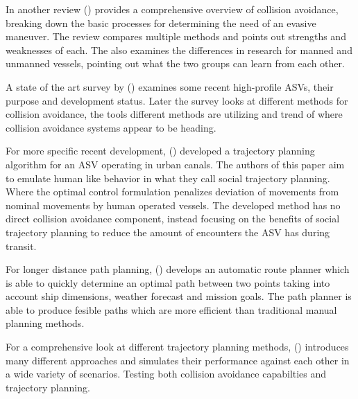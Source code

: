 In another review (\cite{huang2020ship}) provides a comprehensive overview of collision avoidance, breaking down the basic processes
for determining the need of an evasive maneuver. The review compares multiple methods and points out strengths and weaknesses of each.
The also examines the differences in research for manned and unmanned vessels, pointing out what the two groups can learn from each other.

A state of the art survey by (\cite{zhang2021collision}) examines some recent high-profile \gls{ASV}s, their purpose and development status. Later
the survey looks at different methods for collision avoidance, the tools different methods are utilizing and trend of where collision
avoidance systems appear to be heading.

For more specific recent development, (\cite{park2020social}) developed a trajectory planning algorithm for an ASV operating in urban canals. The
authors of this paper aim to emulate human like behavior in what they call social trajectory planning. Where the optimal control formulation
penalizes deviation of movements from nominal movements by human operated vessels. The developed method has no direct collision avoidance component,
instead focusing on the benefits of social trajectory planning to reduce the amount of encounters the ASV has during transit.

For longer distance path planning, (\cite{vestad2019automatic}) develops an automatic route planner which is able to quickly
determine an optimal path between two points taking into account ship dimensions, weather forecast and mission goals. The
path planner is able to produce fesible paths which are more efficient than traditional manual planning methods.

For a comprehensive look at different trajectory planning methods, (\cite{loe2008collision}) introduces many different
approaches and simulates their performance against each other in a wide variety of scenarios. Testing both collision avoidance capabilties and
trajectory planning.


